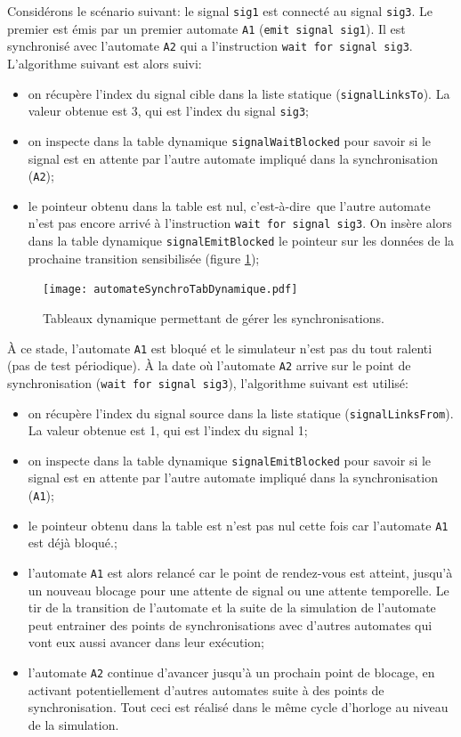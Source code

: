 \documentclass[11pt,a4paper]{article}
\newcommand{\cad}{c'est-à-dire}
\begin{document}
Considérons le scénario suivant: le signal \texttt{sig1} est connecté au signal \texttt{sig3}. Le premier est émis par un premier automate \texttt{A1} (\texttt{emit signal sig1}). Il est synchronisé avec l'automate \texttt{A2} qui a l'instruction \texttt{wait for signal sig3}. L'algorithme suivant est alors suivi:
\begin{itemize}
\item on récupère l'index du signal cible dans la liste statique (\texttt{signalLinksTo}). La valeur obtenue est 3, qui est l'index du signal \texttt{sig3};
\item on inspecte dans la table dynamique \texttt{signalWaitBlocked} pour savoir si le signal est en attente par l'autre automate impliqué dans la synchronisation (\texttt{A2});
\item le pointeur obtenu dans la table est nul, \cad\ que l'autre automate n'est pas encore arrivé à l'instruction \texttt{wait for signal sig3}. On insère alors dans la table dynamique  \texttt{signalEmitBlocked} le pointeur sur les données de la prochaine transition sensibilisée (figure \ref{fig:automateSynchroTabDynamique});
\end{itemize}

\begin{figure}[htbp] %
   \centering
   \texttt{[image: automateSynchroTabDynamique.pdf]} 
   \caption{Tableaux dynamique permettant de gérer les synchronisations.}
   \label{fig:automateSynchroTabDynamique}
\end{figure}

À ce stade, l'automate \texttt{A1} est bloqué et le simulateur n'est pas du tout ralenti (pas de test périodique). À la date où l'automate \texttt{A2} arrive sur le point de synchronisation (\texttt{wait for signal sig3}), l'algorithme suivant est utilisé:
\begin{itemize}
\item on récupère l'index du signal source dans la liste statique (\texttt{signalLinksFrom}). La valeur obtenue est 1, qui est l'index du signal 1;
\item on inspecte dans la table dynamique \texttt{signalEmitBlocked} pour savoir si le signal est en attente par l'autre automate impliqué dans la synchronisation (\texttt{A1});
\item le pointeur obtenu dans la table est n'est pas nul cette fois car l'automate \texttt{A1} est déjà bloqué.;
\item l'automate \texttt{A1} est alors relancé car le point de rendez-vous est atteint, jusqu'à un nouveau blocage pour une attente de signal ou une attente temporelle. Le tir de la transition de l'automate et la suite de la simulation de l'automate peut entrainer des points de synchronisations avec d'autres automates qui vont eux aussi avancer dans leur exécution;
\item l'automate \texttt{A2} continue d'avancer jusqu'à un prochain point de blocage, en activant potentiellement d'autres automates suite à des points de synchronisation. Tout ceci est réalisé dans le même cycle d'horloge au niveau de la simulation. 
\end{itemize}
\end{document}
